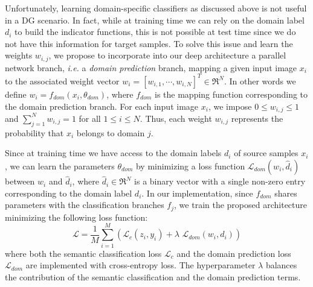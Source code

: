 \documentclass{article}
\begin{document}
Unfortunately, learning domain-specific classifiers as discussed above is not useful in a DG scenario. In fact, while at training time we can rely on the domain label $d_i$ to build the indicator functions, this is not possible at test time since we do not have this information for target samples. To solve this issue and learn the weights $w_{i,j}$, we propose to incorporate into our deep architecture a parallel network branch, \textit{i.e.} a \textit{domain prediction} branch, mapping a given input image $x_i$ to the associated weight vector $w_i=[w_{i,1},\cdots,w_{i,N}]^T\in \Re^N$. In other words we define $w_i=f_{dom}(x_i,\theta_{dom})$,
where $f_{dom}$ is the mapping function corresponding to the domain prediction branch. For each input image $x_i$, we impose $0\leq w_{i,j} \leq 1$ and $\sum_{j=1}^N w_{i,j}=1$ for all $1\leq i\leq N$. Thus, each weight $w_{i,j}$ represents the probability that $x_i$ belongs to domain $j$. 

Since at training time we have access to the domain labels $d_i$ of source samples $x_i$, we can learn the parameters $\theta_{dom}$ by minimizing a loss function $\mathcal{L}_{dom}(w_i,\hat{d}_i)$ between $w_i$ and $\hat{d}_i$, where $\hat{d}_i \in \Re^N$ is a binary vector with a single non-zero entry corresponding to the domain label $d_i$.
In our implementation, since $f_{dom}$ shares parameters with the classification branches $f_{j}$, we train the proposed architecture minimizing the following loss function:
\vspace{-0.1cm}
 \begin{equation}
\label{eq:full-loss}
\mathcal{L}=\frac{1}{M}\sum_{i=1}^{M} \left( \mathcal{L}_{c}(z_i,y_i)+\lambda\,\, \mathcal{L}_{dom}(w_i,d_i) \right)
 \end{equation}
where both the semantic classification loss $\mathcal{L}_c$ and the domain prediction loss $\mathcal{L}_{dom}$ are implemented with cross-entropy loss. The hyperparameter $\lambda$ balances the contribution of the semantic classification and the domain prediction terms.
 
 
\end{document}
